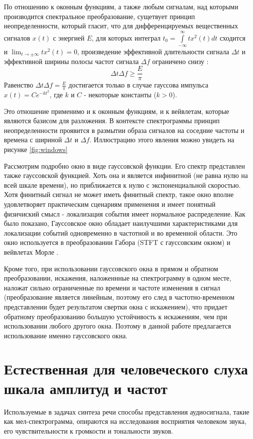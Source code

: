 По отношению к оконным функциям, а также любым сигналам, над которыми производится спектральное преобразование, сущетвует принцип неопределенности, который гласит, что
для дифференцируемых вещественных сигналов 
$x(t)$ с энергией $E$, для которых интеграл 
$t_{0} = \int \limits _{-\infty }^{\infty }tx^{2}(t)dt$ сходится и $\lim _{t\to \pm \infty }tx^{2}(t)=0$, произведение эффективной длительности сигнала 
$\Delta t$ и эффективной ширины полосы частот сигнала $\Delta f$ ограничено снизу \cite{Umnyashkin}:
\begin{equation}
  \Delta t\Delta f\geq {\frac {E}{\pi }}
  \label{eq:uncertainity}
\end{equation}
Равенство $\Delta t\Delta f={\frac {E}{\pi }}$ достигается только в случае гауссова импульса $x(t)=Ce^{-kt^{2}}$, где 
$k$ и $C$ - некоторые константы ($k>0$). \cite{Umnyashkin}

Это отношение применимо и к оконным функциям, и к вейвлетам, которые являются базисом для разложения. 
В контексте спектрограммы принцип неопределенности проявится в размытии образа сигналов на соседние частоты и времена с шириной $\Delta t$ и $\Delta f$.
Иллюстрацию этого явления можно увидеть на рисунке \ref{fig:windows}

Рассмотрим подробно окно в виде гауссовской функции. Его спектр представлен также гауссовской функцией. Хоть она и является инфинитной (не равна нулю на всей шкале времени),
но приближается к нулю с экспоненциальной скоростью. Хотя финитный сигнал не может иметь финитный спектр, 
такое окно вполне удовлетворяет практическим сценариям применения и имеет понятный физичиский смысл - локализация события имеет нормальное распределение.
Как было показано, Гауссовское окно обладает наилучшими характеристиками для локализации событий одновременно в частотной и во временной области.
Это окно используется в преобразовании Габора \cite{Gabor} (STFT с гауссовским окном) и вейвлетах Морле \cite{MorleWavelet}.

Кроме того, при использовании гауссовского окна в прямом и обратном преобразовании, искажения, наложеннные на спектрограмму в одном месте, наложат сильно ограниченные по времени и частоте изменения в сигнал 
(преобразование является линейным, поэтому его след в частотно-временном представлении будет результатом свертки окна с искажением), 
что придает обратному преобразованию большую устойчивость к искажениям, чем при использовании любого другого окна. 
Поэтому в данной работе предлагается использование именно гауссовского окна.


\section{Естественная для человеческого слуха шкала амплитуд и частот}
Используемые в задачах синтеза речи способы представления аудиосигнала, такие как мел-спектрограмма, опираются на исследования восприятия человеком звука, 
его чувствительности к громкости и тональности звуков. 

